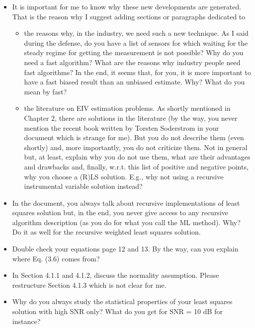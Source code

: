\documentclass[11pt]{article}
\begin{document}
\begin{itemize}
	\item It is important for me to know why these new developments are generated. That is the reason why I suggest adding sections or paragraphs dedicated to
    \begin{itemize}
    
    \item the reasons why, in the industry, we need such a new technique. As I said during the defense, do you have a list of sensors for which waiting for the steady regime for getting the measurement is not possible? Why do you need a fast algorithm? What are the reasons why industry people need fast algorithms? In the end, it seems that, for you, it is more important to have a fast biased result than an unbiased estimate. Why? What do you mean by fast?
        
    \item  the literature on EIV estimation problems. As shortly mentioned in Chapter 2, there are solutions in the literature (by the way, you never mention the recent book written by Torsten Soderstrom in your document which is strange for me). But you do not describe them (even shortly) and, more importantly, you do not criticize them. Not in general but, at least, explain why you do not use them, what are their advantages and drawbacks and, finally, w.r.t. this list of positive and negative points, why you choose a (R)LS solution. E.g., why not using a recursive instrumental variable solution instead?

    \end{itemize}
    \item In the document, you always talk about recursive implementations of least squares solution but, in the end, you never give access to any recursive algorithm description (as you do for what you call the ML method). Why? Do it as well for the recursive weighted least squares solution. 
    
    \item Double check your equations page 12 and 13. By the way, can you explain where Eq. (3.6) comes from?
    
    \item  In Section 4.1.1 and 4.1.2, discuss the normality assumption. Please restructure Section 4.1.3 which is not clear for me. 
    
    \item  Why do you always study the statistical properties of your least squares solution with high SNR only? What do you get for SNR = 10 dB for instance? 
    

\end{itemize}
\end{document}
